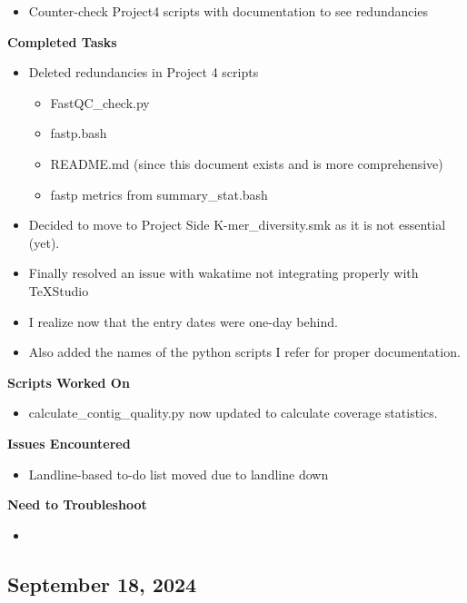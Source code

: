 \documentclass[11pt]{report}
\newcommand{\done}{\checkmark}
\begin{document}
{\begin{multicols}{2}
\begin{itemize}
\begin{itemize}
	
\end{itemize}
	\item [\done] Counter-check Project4 scripts with documentation to see redundancies
\end{itemize}

\textbf{Completed Tasks}
\begin{itemize}
	\item [\done] Deleted redundancies in Project 4 scripts 
		\begin{itemize}
			\item FastQC\_check.py
			\item fastp.bash
			\item README.md (since this document exists and is more comprehensive)
			\item fastp metrics from summary\_stat.bash
		\end{itemize}
	\item [\done] Decided to move to Project Side K-mer\_diversity.smk as it is not essential (yet). 
	\item [\done] Finally resolved an issue with wakatime not integrating properly with TeXStudio
	\item [\done] I realize now that the entry dates were one-day behind.  
	\item [\done] Also added the names of the python scripts I refer for proper documentation. 
\end{itemize}

\textbf{Scripts Worked On}
\begin{itemize}
	\item calculate\_contig\_quality.py now updated to calculate coverage statistics. 
\end{itemize}


\textbf{Issues Encountered}
\begin{itemize}
	\item Landline-based to-do list moved due to landline down 
\end{itemize}

\textbf{Need to Troubleshoot}
\begin{itemize}
	\item 
\end{itemize}
\end{multicols}

\newpage

\begin{multicols}{2}
\section{September 18, 2024}


\end{multicols}}
\end{document}

